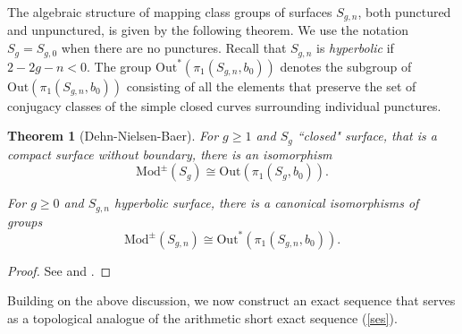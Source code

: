 \documentclass[10pt]{amsart}
\newtheorem{theorem}{Theorem}
\theoremstyle{definition}
\begin{document}
The algebraic structure of mapping class groups of surfaces $S_{g,n}$, both punctured and unpunctured, is given by the following theorem. We use the notation $S_g=S_{g,0}$ when there are no punctures.
Recall that $S_{g,n}$ is {\em hyperbolic} if $2-2g-n<0$. The group $\mathrm{Out}^*(\pi_1(S_{g,n},b_0))$ denotes the subgroup of $\mathrm{Out}(\pi_1(S_{g,n},b_0))$ consisting of all the elements that preserve the set of conjugacy classes of the simple closed curves surrounding individual punctures.
\begin{theorem}[Dehn-Nielsen-Baer]{\label{thm:Dehn-Nielsen-Baer}
  For $g\geq 1$ and $S_g$ ``closed" surface, that is a compact surface without boundary, there is an isomorphism 
  \[
    \mathrm{Mod}^{\pm}(S_g) \cong \mathrm{Out}(\pi_1(S_g,b_0)).
  \]

  For $g\geq 0$ and $S_{g,n}$ hyperbolic surface, there is a canonical isomorphisms of groups
  \[
    \mathrm{Mod}^{\pm}(S_{g,n}) \cong \mathrm{Out}^*(\pi_1(S_{g,n},b_0)).
  \]
}
\end{theorem}
\begin{proof}
  See \cite[Th. 8.1]{FarbMagalit} and \cite[Th. 8.8]{FarbMagalit}.
\end{proof}


Building on the above discussion, we now construct an exact sequence that serves as a topological analogue of the arithmetic short exact sequence (\ref{ses}).
\end{document}

